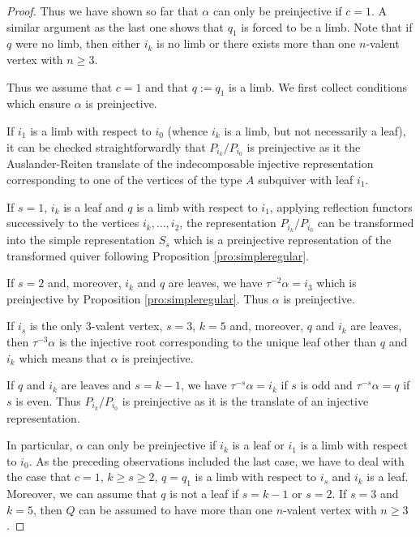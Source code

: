 \documentclass{amsart}
\newcommand{\sayT}[1]{\say[T]{#1}}
\numberwithin{equation}{section}
\begin{document}
\begin{proof}
 

Thus we have shown so far that $\alpha$ can only be preinjective if $c=1$.  A similar argument as the last one shows that $q_1$ is forced to be a limb. Note that if $q$ were no limb, then either $i_k$ is no limb or there exists more than one $n$-valent vertex with $n\geq 3$.

Thus we assume that $c=1$ and that $q:=q_1$ is a limb. We first collect conditions which ensure $\alpha$ is preinjective.

If $i_1$ is a limb with respect to $i_0$ (whence $i_k$ is a limb, but not necessarily a leaf), it can be checked straightforwardly that $P_{i_k}/P_{i_0}$ is preinjective as it the Auslander-Reiten translate of the indecomposable injective representation corresponding to one of the vertices of the type $A$ subquiver with leaf $i_1$.

If $s=1$, $i_k$ is a leaf and $q$ is a limb with respect to $i_1$, applying reflection functors successively to the vertices $i_k,\ldots, i_2$, the representation $P_{i_k}/P_{i_0}$ can be transformed into the simple representation $S_s$ which is a preinjective representation of the transformed quiver following Proposition \ref{pro:simpleregular}. 

If $s=2$ and, moreover, $i_k$ and $q$ are leaves, we have $\tau^{-2}\alpha=i_3$ which is preinjective by Proposition \ref{pro:simpleregular}. Thus $\alpha$ is preinjective.

If $i_s$ is the only $3$-valent vertex, $s=3$, $k=5$ and, moreover, $q$ and $i_k$ are leaves, then $\tau^{-3}\alpha$ is the injective root corresponding to the unique leaf other than $q$ and $i_k$ which means that $\alpha$ is preinjective.

If $q$ and $i_k$ are leaves and $s=k-1$, we have $\tau^{-s}\alpha=i_k$ if $s$ is odd and $\tau^{-s}\alpha=q$ if $s$ is even. Thus $P_{i_k}/P_{i_0}$ is preinjective as it is the translate of an injective representation.


In particular, $\alpha$ can only be preinjective if $i_k$ is a leaf or $i_1$ is a limb with respect to $i_0$.  As the preceding observations included the last case, we have to deal with the case that $c=1$, $k\geq s\geq 2$, $q=q_1$ is a limb with respect to $i_s$ and $i_k$ is a leaf. Moreover, we can assume that $q$ is not a leaf if $s=k-1$ or $s=2$. If $s=3$ and $k=5$, then $Q$ can be assumed to have more than one $n$-valent vertex with $n\geq 3$. 


\end{proof}
\end{document}
